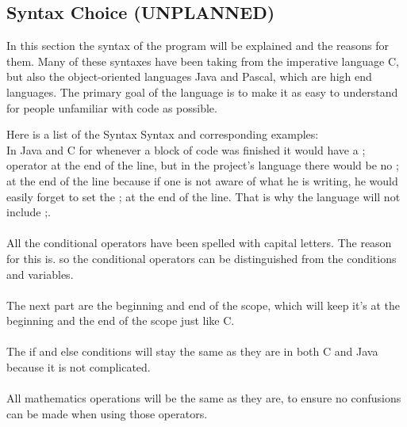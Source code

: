 \subsection{Syntax Choice (UNPLANNED)}
In this section the syntax of the program will be explained and the reasons for them. Many of these syntaxes have been taking from the imperative language C, but also the object-oriented languages Java and Pascal, which are high end languages. The primary goal of the language is to make it as easy to understand for people unfamiliar with code as possible. 

Here is a list of the Syntax %
Syntax and corresponding examples:
 \\ 

 
   
   
   

 
In Java and C for whenever a block of code was finished it would have a ; operator at the end of the line, but in the project's language there would be no ; at the end of the line because if one is not aware of what he is writing, he would easily forget to set the ; at the end of the line. That is why the language will not include ;. \\
 \\

All the conditional operators have been spelled with capital letters. The reason for this is. so the conditional operators can be distinguished from the conditions and variables. \\
 \\

The next part are the beginning and end of the scope, which will keep it's {} at the beginning and the end of the scope just like C.  \\
 \\

The if and else conditions will stay the same as they are in both C and Java because it is not complicated. \\
 \\

All mathematics operations will be the same as they are, to ensure no confusions can be made when using those operators. \\
 \\

